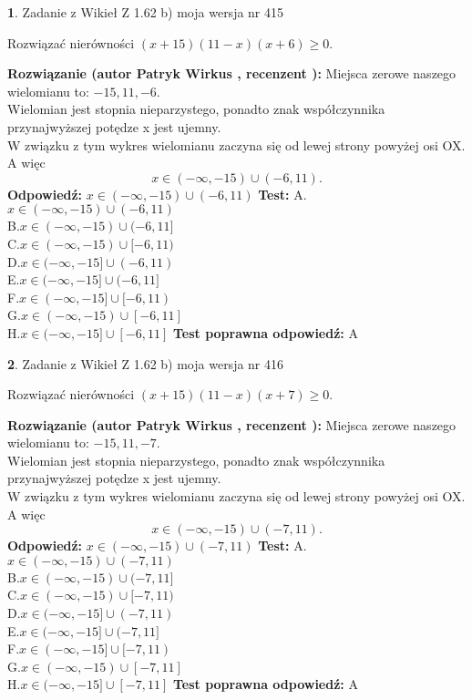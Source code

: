 \documentclass[12pt, a4paper]{article}
\theoremstyle{definition} %
\newtheorem{zad}{}
\newcommand{\zadStart}[1]{\begin{zad}#1\newline}
\newcommand{\zadStop}{\end{zad}}
\newcommand{\rozwStart}[2]{\noindent \textbf{Rozwiązanie (autor #1 , recenzent #2): }\newline}
\newcommand{\rozwStop}{\newline}
\newcommand{\odpStart}{\noindent \textbf{Odpowiedź:}\newline}
\newcommand{\odpStop}{\newline}
\newcommand{\testStart}{\noindent \textbf{Test:}\newline}
\newcommand{\testStop}{\newline}
\newcommand{\kluczStart}{\noindent \textbf{Test poprawna odpowiedź:}\newline}
\newcommand{\kluczStop}{\newline}
\begin{document}
\zadStart{Zadanie z Wikieł Z 1.62 b) moja wersja nr 415}

Rozwiązać nierówności $(x+15)(11-x)(x+6)\ge0$.
\zadStop
\rozwStart{Patryk Wirkus}{}
Miejsca zerowe naszego wielomianu to: $-15, 11, -6$.\\
Wielomian jest stopnia nieparzystego, ponadto znak współczynnika przy\linebreak najwyższej potędze x jest ujemny.\\ W związku z tym wykres wielomianu zaczyna się od lewej strony powyżej osi OX. A więc $$x \in (-\infty,-15) \cup (-6,11).$$
\rozwStop
\odpStart
$x \in (-\infty,-15) \cup (-6,11)$
\odpStop
\testStart
A.$x \in (-\infty,-15) \cup (-6,11)$\\
B.$x \in (-\infty,-15) \cup (-6,11]$\\
C.$x \in (-\infty,-15) \cup [-6,11)$\\
D.$x \in (-\infty,-15] \cup (-6,11)$\\
E.$x \in (-\infty,-15] \cup (-6,11]$\\
F.$x \in (-\infty,-15] \cup [-6,11)$\\
G.$x \in (-\infty,-15) \cup [-6,11]$\\
H.$x \in (-\infty,-15] \cup [-6,11]$
\testStop
\kluczStart
A
\kluczStop



\zadStart{Zadanie z Wikieł Z 1.62 b) moja wersja nr 416}

Rozwiązać nierówności $(x+15)(11-x)(x+7)\ge0$.
\zadStop
\rozwStart{Patryk Wirkus}{}
Miejsca zerowe naszego wielomianu to: $-15, 11, -7$.\\
Wielomian jest stopnia nieparzystego, ponadto znak współczynnika przy\linebreak najwyższej potędze x jest ujemny.\\ W związku z tym wykres wielomianu zaczyna się od lewej strony powyżej osi OX. A więc $$x \in (-\infty,-15) \cup (-7,11).$$
\rozwStop
\odpStart
$x \in (-\infty,-15) \cup (-7,11)$
\odpStop
\testStart
A.$x \in (-\infty,-15) \cup (-7,11)$\\
B.$x \in (-\infty,-15) \cup (-7,11]$\\
C.$x \in (-\infty,-15) \cup [-7,11)$\\
D.$x \in (-\infty,-15] \cup (-7,11)$\\
E.$x \in (-\infty,-15] \cup (-7,11]$\\
F.$x \in (-\infty,-15] \cup [-7,11)$\\
G.$x \in (-\infty,-15) \cup [-7,11]$\\
H.$x \in (-\infty,-15] \cup [-7,11]$
\testStop
\kluczStart
A
\kluczStop
\end{document}
